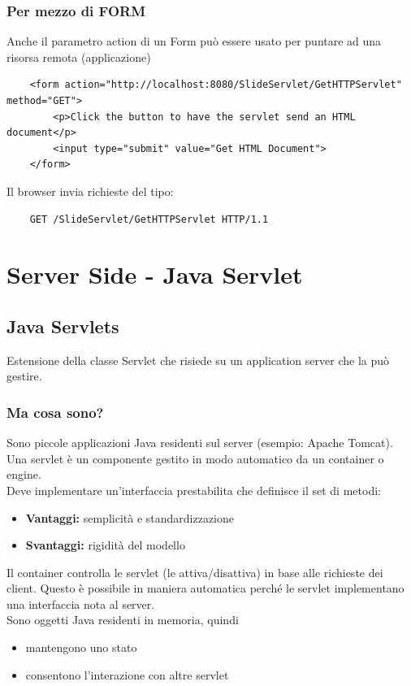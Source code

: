 \subsubsection{Per mezzo di FORM}
Anche il parametro action di un Form può essere usato per puntare ad una risorsa remota (applicazione)
\begin{verbatim}
    <form action="http://localhost:8080/SlideServlet/GetHTTPServlet" method="GET">
        <p>Click the button to have the servlet send an HTML document</p>
        <input type="submit" value="Get HTML Document">
    </form>
\end{verbatim}
Il browser invia richieste del tipo:
\begin{verbatim}
    GET /SlideServlet/GetHTTPServlet HTTP/1.1
\end{verbatim}


\section{Server Side - Java Servlet}
\subsection{Java Servlets}
Estensione della classe Servlet che risiede su un application server che la può gestire.

\subsubsection{Ma cosa sono?}
Sono piccole applicazioni Java residenti sul server (esempio: Apache Tomcat).
\\Una servlet è un componente gestito in modo automatico da un container o engine.
\\Deve implementare un'interfaccia prestabilita che definisce il set di metodi:
\begin{itemize}
    \item \textbf{Vantaggi:} semplicità e standardizzazione
    \item \textbf{Svantaggi:} rigidità del modello
\end{itemize}
Il container controlla le servlet (le attiva/disattiva) in base alle richieste dei client. Questo è possibile in
maniera automatica perché le servlet implementano una interfaccia nota al server.
\\Sono oggetti Java residenti in memoria, quindi
\begin{itemize}
    \item mantengono uno stato
    \item consentono l'interazione con altre servlet
\end{itemize}

